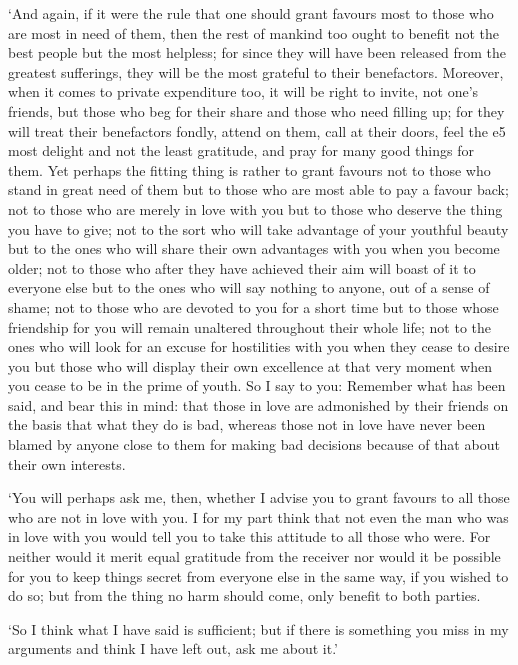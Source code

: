  ‘And again, if it were the rule that one should grant favours
most to those who are most in need of them, then the rest of mankind too
ought to benefit not the best people but the most helpless; for since
they will have been released from the greatest sufferings, they will be
the most grateful to their benefactors.  Moreover, when it comes
to private expenditure too, it will be right to invite, not one's
friends, but those who beg for their share and those who need filling
up; for they will treat their benefactors fondly, attend on them, call
at their doors, feel the e5 most delight and not the least gratitude,
and pray for many good things for them. Yet perhaps the fitting thing is
rather to grant favours not to those who stand in great need of them but
to those who are most able to pay a favour back; not to those 
who are merely in love with you but to those who deserve the thing you
have to give; not to the sort who will take advantage of your youthful
beauty but to the ones who will share their own advantages with you when
you become older; not to those who after they have achieved their aim
will boast of it to  everyone else but to the ones who will say
nothing to anyone, out of a sense of shame; not to those who are devoted
to you for a short time but to those whose friendship for you will
remain unaltered throughout their whole life; not to the ones who will
look for an excuse for hostilities with you when they cease to desire
you but those who will display their own excellence at that very moment
when you cease to be in the  prime of youth. So I say to you:
Remember what has been said, and bear this in mind: that those in love
are admonished by their friends on the basis that what they do is bad,
whereas those not in love have never been blamed by anyone close to them
for making bad decisions because of that about their own 
interests.

‘You will perhaps ask me, then, whether I advise you to grant favours to
all those who are not in love with you. I for my part think that not
even the man who was in love with you would tell you to take this
attitude to all those who were. For neither  would it merit
equal gratitude from the receiver nor would it be possible for you to
keep things secret from everyone else in the same way, if you wished to
do so; but from the thing
no harm should come, only benefit to both parties.

‘So I think what I have said is sufficient; but if there is 
something you miss in my
arguments and think I have left out, ask me about it.'


